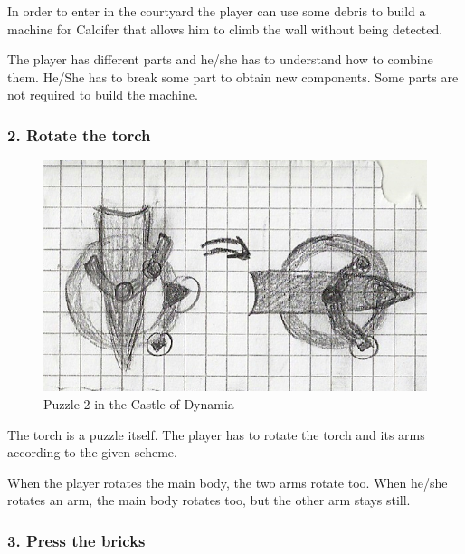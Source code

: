 In order to enter in the courtyard the player can use some debris to build a machine for Calcifer that allows him to climb the wall without being detected.

The player has different parts and he/she has to understand how to combine them. He/She has to break some part to obtain new components. Some parts are not required to build the machine.

\subsubsection*{2. Rotate the torch}

\begin{figure}[H]
  \centering
  \includegraphics[width=\textwidth]{Images/Puzzles/castleOfDynamia_2}
  \caption{Puzzle 2 in the Castle of Dynamia}
\end{figure}

The torch is a puzzle itself. The player has to rotate the torch and its arms according to the given scheme.

When the player rotates the main body, the two arms rotate too. When he/she rotates an arm, the main body rotates too, but the other arm stays still.

\subsubsection*{3. Press the bricks}

